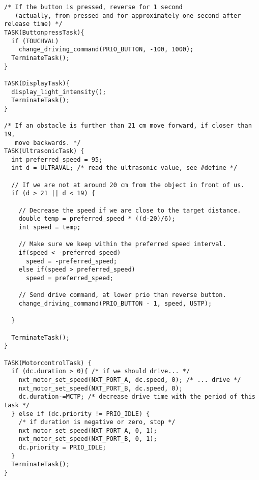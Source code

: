 \documentclass[a4paper,10pt]{report}
\begin{document}
\begin{lstlisting}[label=some-code,caption=part3.c,mathescape]
/* If the button is pressed, reverse for 1 second
   (actually, from pressed and for approximately one second after release time) */
TASK(ButtonpressTask){
  if (TOUCHVAL)
    change_driving_command(PRIO_BUTTON, -100, 1000); 		
  TerminateTask();
}

TASK(DisplayTask){
  display_light_intensity();
  TerminateTask();
}

/* If an obstacle is further than 21 cm move forward, if closer than 19,
   move backwards. */ 
TASK(UltrasonicTask) {
  int preferred_speed = 95;
  int d = ULTRAVAL; /* read the ultrasonic value, see #define */

  // If we are not at around 20 cm from the object in front of us.
  if (d > 21 || d < 19) {
  
    // Decrease the speed if we are close to the target distance.
    double temp = preferred_speed * ((d-20)/6);
    int speed = temp;

    // Make sure we keep within the preferred speed interval.
    if(speed < -preferred_speed)
      speed = -preferred_speed; 
    else if(speed > preferred_speed) 
      speed = preferred_speed;
    
    // Send drive command, at lower prio than reverse button.
    change_driving_command(PRIO_BUTTON - 1, speed, USTP);
    
  }

  TerminateTask();
}

TASK(MotorcontrolTask) {
  if (dc.duration > 0){ /* if we should drive... */
    nxt_motor_set_speed(NXT_PORT_A, dc.speed, 0); /* ... drive */
    nxt_motor_set_speed(NXT_PORT_B, dc.speed, 0);
    dc.duration-=MCTP; /* decrease drive time with the period of this task */
  } else if (dc.priority != PRIO_IDLE) { 
    /* if duration is negative or zero, stop */
    nxt_motor_set_speed(NXT_PORT_A, 0, 1);
    nxt_motor_set_speed(NXT_PORT_B, 0, 1);
    dc.priority = PRIO_IDLE;
  }
  TerminateTask();
}

\end{lstlisting}
\newpage
\end{document}
